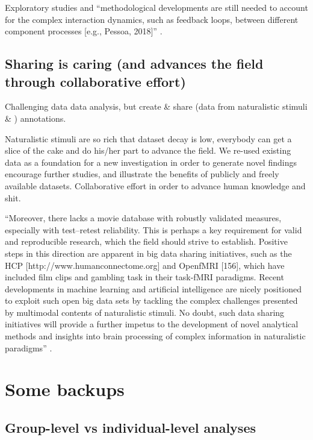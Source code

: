 %
Exploratory studies and ``methodological developments are still needed to
account for the complex interaction dynamics, such as feedback loops, between
different component processes [e.g., Pessoa, 2018]''
\citep{saarimaki2021naturalistic}.





\subsection{Sharing is caring (and advances the field through collaborative
effort)}

%
Challenging data data analysis, but create \& share (data from naturalistic
stimuli \& ) annotations.

%
Naturalistic stimuli are so rich that dataset decay is low, everybody can get
a slice of the cake and do his/her part to advance the field.
%
We re-used existing data as a foundation for a new investigation in order to
generate novel findings encourage further studies, and illustrate the benefits
of publicly and freely available datasets.
%
Collaborative effort in order to advance human knowledge and shit.

%
``Moreover, there lacks a movie database with robustly validated measures,
especially with test--retest reliability.
%
This is perhaps a key requirement for valid and reproducible research, which the
field should strive to establish.
%
Positive steps in this direction are apparent in big data sharing initiatives,
such as the HCP [http://www.humanconnectome.org] and OpenfMRI [156], which have
included film clips and gambling task in their task-fMRI paradigms.
%
Recent developments in machine learning and artificial intelligence are nicely
positioned to exploit such open big data sets by tackling the complex challenges
presented by multimodal contents of naturalistic stimuli.
%
No doubt, such data sharing initiatives will provide a further impetus to the
development of novel analytical methods and insights into brain processing of
complex information in naturalistic paradigms''
\citep{sonkusare2019naturalistic}.



\pagebreak


\section{Some backups}


\subsection{Group-level vs individual-level analyses}

